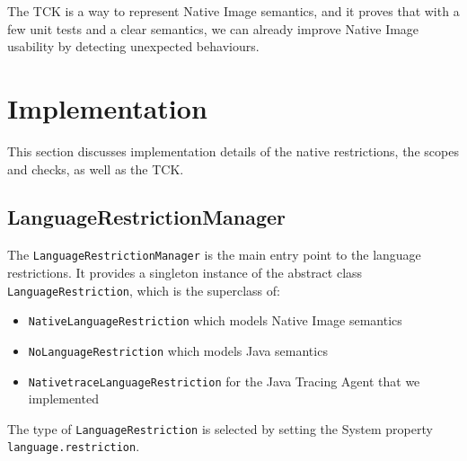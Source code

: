 The TCK is a way to represent Native Image semantics, and it proves that with a few unit tests and a clear semantics, we can already improve Native Image usability by detecting unexpected behaviours.


\chapter{Implementation}

This section discusses implementation details of the native restrictions, the scopes and checks, as well as the TCK.

\section{LanguageRestrictionManager}
The \verb|LanguageRestrictionManager| is the main entry point to the language restrictions. It provides a singleton instance of the abstract class \verb|LanguageRestriction|, which is the superclass of: 
\begin{itemize}
    \item \texttt{NativeLanguageRestriction} which models Native Image semantics
    \item \texttt{NoLanguageRestriction} which  models Java semantics
    \item \texttt{NativetraceLanguageRestriction} for the Java Tracing Agent that we implemented
\end{itemize}
The type of \verb|LanguageRestriction| is selected by setting the System property \verb|language.restriction|. 


